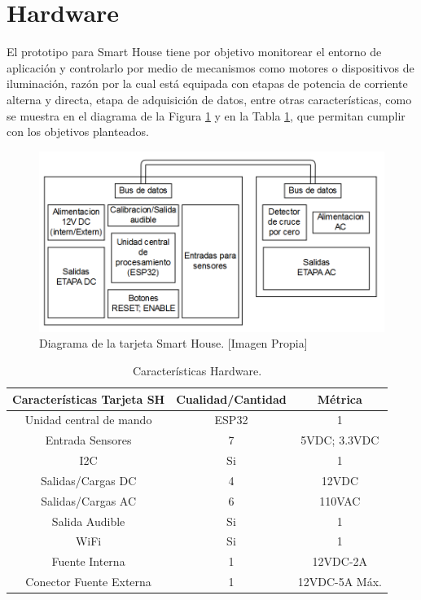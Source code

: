 \section{Hardware}\label{sec:hw}

El prototipo para Smart House tiene por objetivo monitorear el entorno de aplicación y controlarlo por medio de mecanismos como motores o dispositivos de iluminación, razón por la cual está equipada con etapas de potencia de corriente alterna y directa, etapa de adquisición de datos, entre otras características, como se muestra en el diagrama de la Figura \ref{fig:tar} y en la Tabla \ref{fig:tar}, que permitan cumplir con los objetivos planteados.\\

\begin{figure}[H]
	\centering
	\caption[Diagrama de la tarjeta Smart House.]{Diagrama de la tarjeta Smart House.  [Imagen Propia]}
	\label{fig:tar}
	\includegraphics[width=0.7\linewidth]{Imagenes/Tarjeta}
\end{figure}

\begin{table}[H]
	\begin{center}
		\caption{Características Hardware.}
		\label{table:carac}
		\begin{tabular}{|c|c|c|}
			\hline 
			\textbf{Características Tarjeta SH} & \textbf{Cualidad/Cantidad} & \textbf{Métrica} \\ 
			\hline 
			Unidad central de mando & ESP32 & 1\\ 
			\hline 
			Entrada Sensores & 7 & 5VDC; 3.3VDC\\
			\hline 
			I2C & Si & 1\\
			\hline 
			Salidas/Cargas DC & 4 & 12VDC\\
			\hline 
			Salidas/Cargas AC & 6 & 110VAC\\
			\hline 
			Salida Audible & Si & 1\\
			\hline 
			WiFi & Si & 1\\ 
			\hline 
			Fuente Interna & 1 & 12VDC-2A\\
			\hline
			Conector Fuente Externa & 1 & 12VDC-5A Máx.\\
			\hline
		\end{tabular} 
	\end{center}
\end{table}


